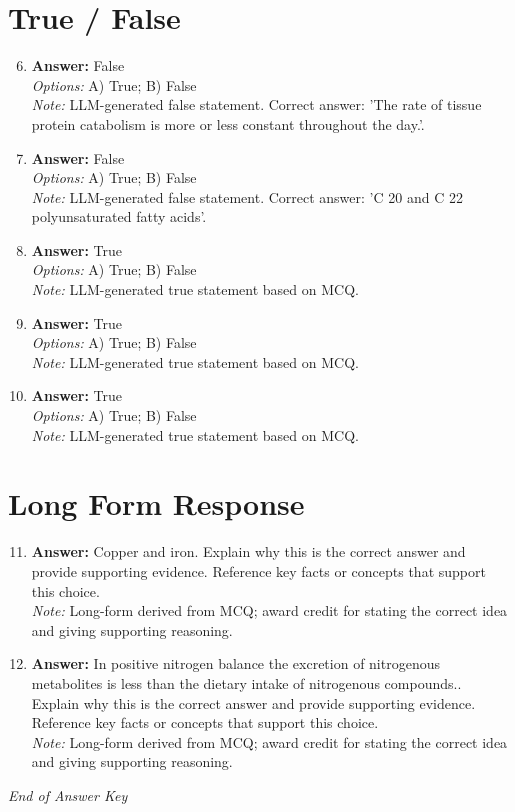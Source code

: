 \documentclass[12pt]{article}
\begin{document}
\section*{True / False}
\begin{enumerate}[label=\arabic*.]
\setcounter{enumi}{5}
\item \textbf{Answer:} False
\\ \textit{Options:} A) True; B) False
\\ \textit{Note:} LLM-generated false statement. Correct answer: 'The rate of tissue protein catabolism is more or less constant throughout the day.'.
\item \textbf{Answer:} False
\\ \textit{Options:} A) True; B) False
\\ \textit{Note:} LLM-generated false statement. Correct answer: 'C 20 and C 22 polyunsaturated fatty acids'.
\item \textbf{Answer:} True
\\ \textit{Options:} A) True; B) False
\\ \textit{Note:} LLM-generated true statement based on MCQ.
\item \textbf{Answer:} True
\\ \textit{Options:} A) True; B) False
\\ \textit{Note:} LLM-generated true statement based on MCQ.
\item \textbf{Answer:} True
\\ \textit{Options:} A) True; B) False
\\ \textit{Note:} LLM-generated true statement based on MCQ.
\end{enumerate}

\section*{Long Form Response}
\begin{enumerate}[label=\arabic*.]
\setcounter{enumi}{10}
\item \textbf{Answer:} Copper and iron. Explain why this is the correct answer and provide supporting evidence. Reference key facts or concepts that support this choice.
\\ \textit{Note:} Long-form derived from MCQ; award credit for stating the correct idea and giving supporting reasoning.
\item \textbf{Answer:} In positive nitrogen balance the excretion of nitrogenous metabolites is less than the dietary intake of nitrogenous compounds.. Explain why this is the correct answer and provide supporting evidence. Reference key facts or concepts that support this choice.
\\ \textit{Note:} Long-form derived from MCQ; award credit for stating the correct idea and giving supporting reasoning.
\end{enumerate}

\vfill
\noindent\textit{End of Answer Key}
\end{document}
